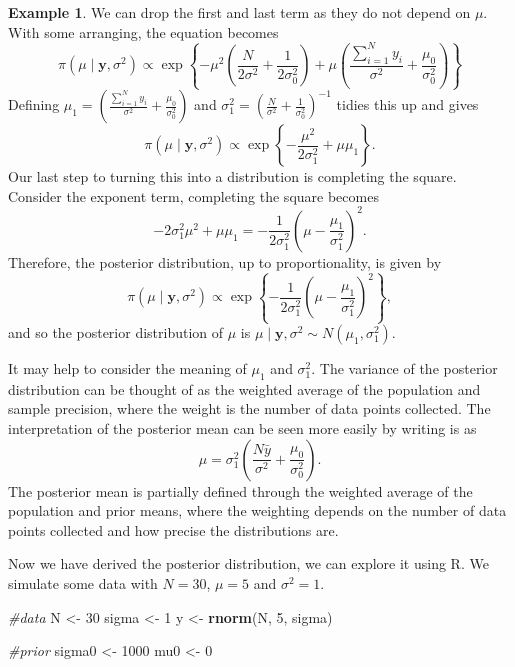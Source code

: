 \documentclass[
]{book}
\newenvironment{Shaded}{\begin{snugshade}}{\end{snugshade}}
\newcommand{\CommentTok}[1]{\textcolor[rgb]{0.56,0.35,0.01}{\textit{#1}}}
\newcommand{\DecValTok}[1]{\textcolor[rgb]{0.00,0.00,0.81}{#1}}
\newcommand{\FunctionTok}[1]{\textcolor[rgb]{0.13,0.29,0.53}{\textbf{#1}}}
\newcommand{\NormalTok}[1]{#1}
\newcommand{\OtherTok}[1]{\textcolor[rgb]{0.56,0.35,0.01}{#1}}
\theoremstyle{definition}
\theoremstyle{definition}
\newtheorem{example}{Example}[chapter]
\theoremstyle{definition}
\theoremstyle{definition}
\theoremstyle{remark}
\begin{document}
\begin{example}
We can drop the first and last term as they do not depend on \(\mu\). With some arranging, the equation becomes
\[
\pi(\mu \mid \boldsymbol{y}, \sigma^2) \propto \exp\left\{-\mu^2\left(\frac{N}{2\sigma^2}  + \frac{1}{2\sigma_0^2}\right) + \mu\left(\frac{\sum_{i=1}^{N}y_i}{\sigma^2} + \frac{\mu_0}{\sigma_0^2} \right)  \right\}
\]
Defining \(\mu_1 =\left(\frac{\sum_{i=1}^{N}y_i}{\sigma^2} + \frac{\mu_0}{\sigma_0^2} \right)\) and \(\sigma^2_1 = \left(\frac{N}{\sigma^2}  + \frac{1}{\sigma_0^2}\right)^{-1}\) tidies this up and gives
\[
\pi(\mu \mid \boldsymbol{y}, \sigma^2) \propto \exp\left\{-\frac{\mu^2}{2\sigma_1^2} + \mu\mu_1 \right\}.
\]
Our last step to turning this into a distribution is completing the square. Consider the exponent term, completing the square becomes
\[
-2\sigma_1^2\mu^2 + \mu\mu_1 = -\frac{1}{2\sigma^2_1}\left(\mu - \frac{\mu_1}{\sigma_1^2} \right)^2.
\]
Therefore, the posterior distribution, up to proportionality, is given by
\[
\pi(\mu \mid \boldsymbol{y}, \sigma^2) \propto \exp\left\{-\frac{1}{2\sigma^2_1}\left(\mu - \frac{\mu_1}{\sigma_1^2} \right)^2\right\},
\]
and so the posterior distribution of \(\mu\) is \(\mu \mid \boldsymbol{y}, \sigma^2 \sim N(\mu_1, \sigma^2_1)\).

It may help to consider the meaning of \(\mu_1\) and \(\sigma^2_1\). The variance of the posterior distribution can be thought of as the weighted average of the population and sample precision, where the weight is the number of data points collected. The interpretation of the posterior mean can be seen more easily by writing is as
\[
\mu  = \sigma_1^2\left(\frac{N\bar{y}}{\sigma^2} + \frac{\mu_0}{\sigma_0^2} \right).
\]
The posterior mean is partially defined through the weighted average of the population and prior means, where the weighting depends on the number of data points collected and how precise the distributions are.

Now we have derived the posterior distribution, we can explore it using R. We simulate some data with \(N = 30\), \(\mu = 5\) and \(\sigma^2 = 1\).

\begin{Shaded}
\begin{Highlighting}[]
\CommentTok{\#data}
\NormalTok{N }\OtherTok{\textless{}{-}} \DecValTok{30}
\NormalTok{sigma }\OtherTok{\textless{}{-}} \DecValTok{1}
\NormalTok{y }\OtherTok{\textless{}{-}} \FunctionTok{rnorm}\NormalTok{(N, }\DecValTok{5}\NormalTok{, sigma)}

\CommentTok{\#prior}
\NormalTok{sigma0 }\OtherTok{\textless{}{-}} \DecValTok{1000}
\NormalTok{mu0     }\OtherTok{\textless{}{-}} \DecValTok{0}


\end{Highlighting}
\end{Shaded}
\end{example}
\end{document}

